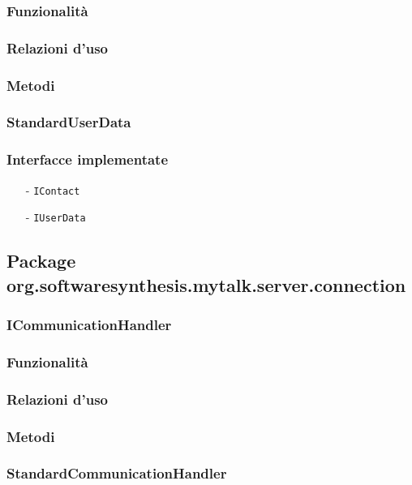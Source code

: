 \subsubsection*{Funzionalità}
\subsubsection*{Relazioni d'uso}
\subsubsection*{Metodi}

\subsubsection{StandardUserData}\label{sec:standarduserdata}
\subsubsection*{Interfacce implementate}
\begin{itemize}[noitemsep,nolistsep]
  \item[-] \texttt{IContact}
  \item[-] \texttt{IUserData}
\end{itemize}

\subsection{Package org.softwaresynthesis.mytalk.server.connection}\label{sec:connection}

\subsubsection{ICommunicationHandler}\label{sec:icommunicationhandler}

\subsubsection*{Funzionalità}

\subsubsection*{Relazioni d'uso}


\subsubsection*{Metodi}

\subsubsection{StandardCommunicationHandler}\label{sec:standardcommunicationhandler}

